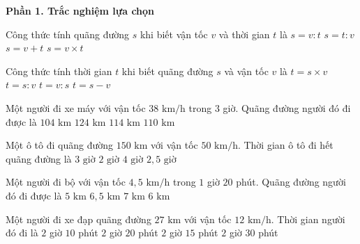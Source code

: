 \textbf{Phần 1. Trắc nghiệm lựa chọn}

\begin{ex} %
Công thức tính quãng đường $s$ khi biết vận tốc $v$ và thời gian $t$ là
\choice
{$s = v : t$}
{$s = t : v$}
{$s = v + t$}
{\True $s = v \times t$}
\end{ex}

\begin{ex} %
Công thức tính thời gian $t$ khi biết quãng đường $s$ và vận tốc $v$ là
\choice
{$t = s \times v$}
{\True $t = s : v$}
{$t = v : s$}
{$t = s - v$}
\end{ex}

\begin{ex} %
Một người đi xe máy với vận tốc $38\text{ km/h}$ trong $3$ giờ. Quãng đường người đó đi được là
\choice
{$104\text{ km}$}
{$124\text{ km}$}
{\True $114\text{ km}$}
{$110\text{ km}$}
\end{ex}

\begin{ex} %
Một ô tô đi quãng đường $150\text{ km}$ với vận tốc $50\text{ km/h}$. Thời gian ô tô đi hết quãng đường là
\choice
{\True $3\text{ giờ}$}
{$2\text{ giờ}$}
{$4\text{ giờ}$}
{$2{,}5\text{ giờ}$}
\end{ex}

\begin{ex} %
Một người đi bộ với vận tốc $4{,}5\text{ km/h}$ trong $1$ giờ $20$ phút. Quãng đường người đó đi được là
\choice
{$5\text{ km}$}
{$6{,}5\text{ km}$}
{$7\text{ km}$}
{\True $6\text{ km}$}
\end{ex}

\begin{ex} %
Một người đi xe đạp quãng đường $27\text{ km}$ với vận tốc $12\text{ km/h}$. Thời gian người đó đi là
\choice
{$2$ giờ $10$ phút}
{$2$ giờ $20$ phút}
{\True $2$ giờ $15$ phút}
{$2$ giờ $30$ phút}
\end{ex}

